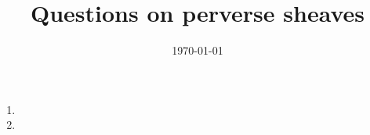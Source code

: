 \documentclass[11pt,a4]{amsart}
\title{Questions on perverse sheaves}
\date{\today}
\numberwithin{equation}{section} %
\begin{document}
\begin{enumerate}
 \item %
   \item
    \begin{enumerate}
    \end{enumerate}
\end{enumerate}
\end{document}
